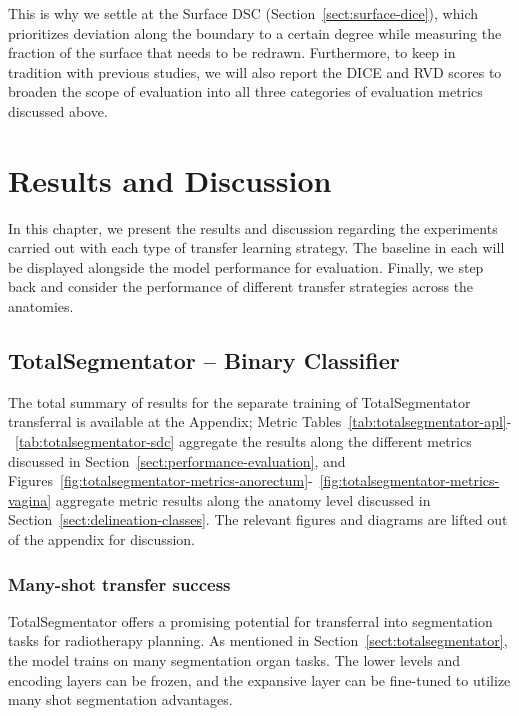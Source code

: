 \documentclass[11pt,twoside]{report}
\begin{document}
This is why we settle at the Surface DSC (Section~\ref{sect:surface-dice}), which prioritizes deviation along the boundary to a certain degree while measuring the fraction of the surface that needs to be redrawn. Furthermore, to keep in tradition with previous studies, we will also report the DICE and RVD scores to broaden the scope of evaluation into all three categories of evaluation metrics discussed above. 

\chapter{Results and Discussion}\label{sect:results}\label{sect:discussion}

In this chapter, we present the results and discussion regarding the experiments carried out with each type of transfer learning strategy. The baseline in each will be displayed alongside the model performance for evaluation. Finally, we step back and consider the performance of different transfer strategies across the anatomies.

\section{TotalSegmentator -- Binary Classifier}

The total summary of results for the separate training of TotalSegmentator transferral is available at the Appendix; Metric Tables~\ref{tab:totalsegmentator-apl}-~\ref{tab:totalsegmentator-sdc} aggregate the results along the different metrics discussed in Section~\ref{sect:performance-evaluation}, and Figures~\ref{fig:totalsegmentator-metrics-anorectum}-~\ref{fig:totalsegmentator-metrics-vagina} aggregate metric results along the anatomy level discussed in Section~\ref{sect:delineation-classes}. The relevant figures and diagrams are lifted out of the appendix for discussion.


\subsection{Many-shot transfer success}\label{sec:totalsegmentator-many-shot-transfer-success}

TotalSegmentator offers a promising potential for transferral into segmentation tasks for radiotherapy planning. As mentioned in Section~\ref{sect:totalsegmentator}, the model trains on many segmentation organ tasks. The lower levels and encoding layers can be frozen, and the expansive layer can be fine-tuned to utilize many shot segmentation advantages. 
\end{document}

